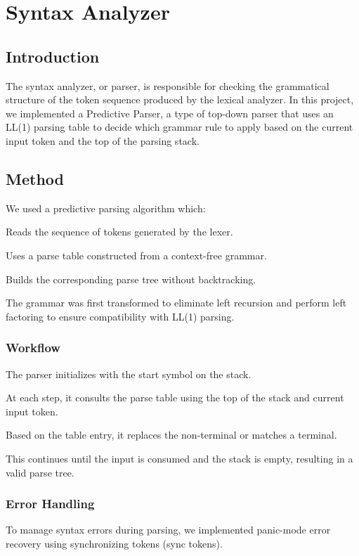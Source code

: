 \documentclass[12pt, a4paper]{report}
\begin{document}
\chapter{Syntax Analyzer}

\section{Introduction}

The syntax analyzer, or parser, is responsible for checking the grammatical structure of the token sequence produced by the lexical analyzer. In this project, we implemented a Predictive Parser, a type of top-down parser that uses an LL(1) parsing table to decide which grammar rule to apply based on the current input token and the top of the parsing stack.

\section{Method}

We used a predictive parsing algorithm which:

Reads the sequence of tokens generated by the lexer.

Uses a parse table constructed from a context-free grammar.

Builds the corresponding parse tree without backtracking.

The grammar was first transformed to eliminate left recursion and perform left factoring to ensure compatibility with LL(1) parsing.

\subsection{Workflow}

The parser initializes with the start symbol on the stack.

At each step, it consults the parse table using the top of the stack and current input token.

Based on the table entry, it replaces the non-terminal or matches a terminal.

This continues until the input is consumed and the stack is empty, resulting in a valid parse tree.

\subsection{Error Handling}

To manage syntax errors during parsing, we implemented panic-mode error recovery using synchronizing tokens (sync tokens).
\end{document}
